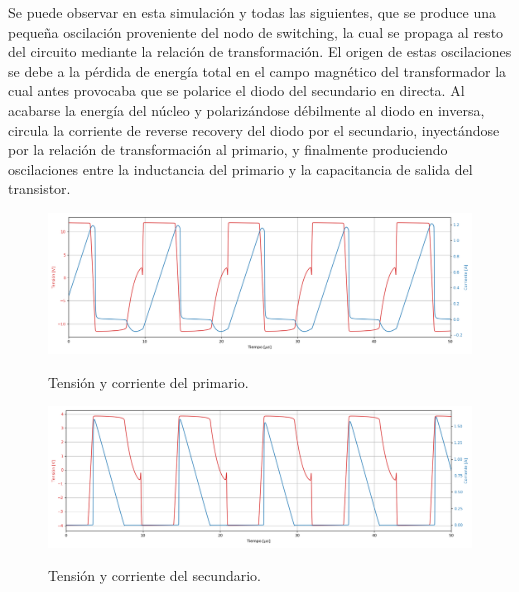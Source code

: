 Se puede observar en esta simulación y todas las siguientes, que se produce una pequeña oscilación proveniente del nodo de switching, la cual se propaga al resto del circuito mediante la relación de transformación. El origen de estas oscilaciones se debe a la pérdida de energía total en el campo magnético del transformador la cual antes provocaba que se polarice el diodo del secundario en directa. Al acabarse la energía del núcleo y polarizándose débilmente al diodo en inversa, circula la corriente de reverse recovery del diodo por el secundario, inyectándose por la relación de transformación al primario, y finalmente produciendo oscilaciones entre la inductancia del primario y la capacitancia de salida del transistor.

\begin{figure}[H]
	\centering
	\includegraphics[width=0.9\linewidth]{ImagenesParteIII/Primario.png}
	\label{fig:primario}
	\caption{Tensión y corriente del primario.}
\end{figure}

\begin{figure}[H]
	\centering
	\includegraphics[width=0.9\linewidth]{ImagenesParteIII/Secundario.png}
	\label{fig:secundario}
	\caption{Tensión y corriente del secundario.}
\end{figure}

